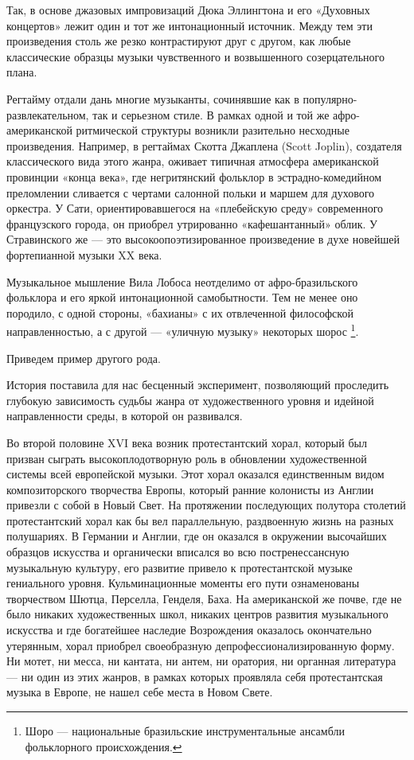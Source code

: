 Так, в  основе джазовых импровизаций  Дюка Эллингтона и  его «Духовных
концертов»  лежит один  и  тот же  интонационный  источник. Между  тем
эти  произведения   столь  же  резко  контрастируют   друг  с  другом,
как  любые классические  образцы  музыки  чувственного и  возвышенного
созерцательного плана.

Регтайму   отдали   дань   многие    музыканты,   сочинявшие   как   в
популярно-развлекательном,   так   и   серьезном   стиле.   В   рамках
одной  и  той  же  афро-американской  ритмической  структуры  возникли
разительно  несходные  произведения.   Например,  в  регтаймах  Скотта
Джаплена  (Scott Joplin),  создателя классического  вида этого  жанра,
оживает типичная  атмосфера американской  провинции «конца  века», где
негритянский  фольклор в  эстрадно-комедийном преломлении  сливается с
чертами  салонной  польки и  маршем  для  духового оркестра.  У  Сати,
ориентировавшегося  на  «плебейскую среду»  современного  французского
города, он приобрел утрированно  «кафешантанный» облик. У Стравинского
же  —   это  высокоопоэтизированное   произведение  в   духе  новейшей
фортепианной музыки XX века.

Музыкальное  мышление  Вила  Лобоса  неотделимо  от  афро-бразильского
фольклора и  его яркой  интонационной самобытности.  Тем не  менее оно
породило,  с одной  стороны,  «бахианы» с  их отвлеченной  философской
направленностью,  а  с  другой  —  «уличную  музыку»  некоторых  шорос
\footnote{Шоро  — национальные  бразильские инструментальные  ансамбли
фольклорного происхождения.}.

Приведем пример другого рода.

История   поставила  для   нас   бесценный  эксперимент,   позволяющий
проследить глубокую зависимость судьбы жанра от художественного уровня
и идейной направленности среды, в которой он развивался.

Во второй половине  XVI века возник протестантский  хорал, который был
призван  сыграть высокоплодотворную  роль в  обновлении художественной
системы  всей европейской  музыки.  Этот  хорал оказался  единственным
видом композиторского  творчества Европы, который ранние  колонисты из
Англии  привезли  с собой  в  Новый  Свет. На  протяжении  последующих
полутора  столетий  протестантский  хорал  как  бы  вел  параллельную,
раздвоенную жизнь  на разных полушариях.  В Германии и Англии,  где он
оказался  в  окружении  высочайших образцов  искусства  и  органически
вписался во  всю постренессансную  музыкальную культуру,  его развитие
привело  к протестантской  музыке гениального  уровня. Кульминационные
моменты его  пути ознаменованы  творчеством Шютца,  Перселла, Генделя,
Баха. На  американской же  почве, где  не было  никаких художественных
школ, никаких центров развития музыкального искусства и где богатейшее
наследие Возрождения оказалось  окончательно утерянным, хорал приобрел
своеобразную депрофессионализированную  форму. Ни мотет, ни  месса, ни
кантата, ни  антем, ни оратория, ни  органная литература — ни  один из
этих жанров, в  рамках которых проявляла себя  протестантская музыка в
Европе, не нашел себе места в Новом Свете.

